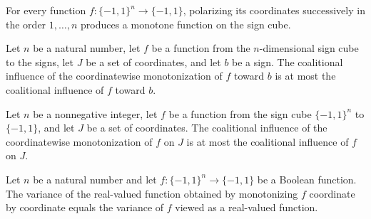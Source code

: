 \begin{theorem}
\label{FABL.monotone_monotonization}
\leanok
{}
For every function $f:\{ -1,1\}^n\to\{-1,1\}$, polarizing its coordinates successively
in the order $1,\ldots,n$ produces a monotone function on the sign cube.
\end{theorem}

\begin{theorem}
\label{FABL.coalitionalInfluenceToward_monotonization_le}
\leanok
{}
Let $n$ be a natural number, let $f$ be a function from the $n$-dimensional sign cube to
the signs, let $J$ be a set of coordinates, and let $b$ be a sign. The coalitional
influence of the coordinatewise monotonization of $f$ toward $b$ is at most the
coalitional influence of $f$ toward $b$.
\end{theorem}

\begin{theorem}
\label{FABL.coalitionalInfluence_monotonization_le}
\leanok
{}
Let $n$ be a nonnegative integer, let $f$ be a function from the sign cube
$\{-1,1\}^n$ to $\{-1,1\}$, and let $J$ be a set of coordinates. The coalitional
influence of the coordinatewise monotonization of $f$ on $J$ is at most the coalitional
influence of $f$ on $J$.
\end{theorem}

\begin{theorem}
\label{FABL.variance_monotonization}
\leanok
{}
Let $n$ be a natural number and let $f:\{−1,1\}^n\to\{−1,1\}$ be a Boolean function. The
variance of the real-valued function obtained by monotonizing $f$ coordinate by
coordinate equals the variance of $f$ viewed as a real-valued function.
\end{theorem}

